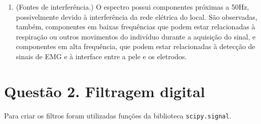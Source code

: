 \documentclass[12pt,letterpaper]{article}
\begin{document}
\begin{enumerate}[label=(\alph*)]
    \item (Fontes de interferência.) O espectro possui componentes próximas a 50Hz, possivelmente devido à interferência da rede elétrica do local. São observadas, também, componentes em baixas frequências que podem estar relacionadas à respiração ou outros movimentos do indivíduo durante a aquisição do sinal, e componentes em alta frequência, que podem estar relacionadas à detecção de sinais de EMG e à interface entre a pele e os eletrodos.
    

\end{enumerate}

\section*{Questão 2. Filtragem digital}
Para criar os filtros foram utilizadas funções da biblioteca \lstinline{scipy.signal}.
\end{document}
